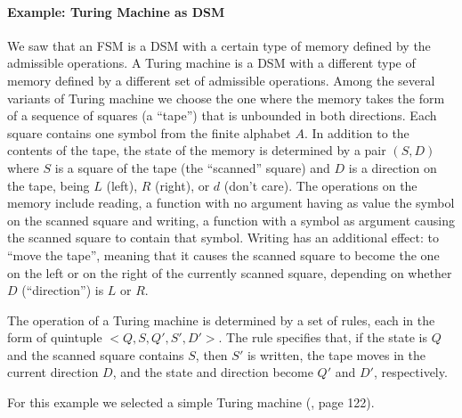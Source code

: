 \documentclass[preprint,11pt]{elsarticle}
\begin{document}
\paragraph{Example: Turing Machine as DSM}
We saw that an FSM is a DSM with a certain type of memory
defined by the admissible operations.
A Turing machine is a DSM with a different type of memory
defined by a different set of admissible operations.
Among the several variants of Turing machine
we choose the one where the memory takes the form of
a sequence of squares (a ``tape'') that is unbounded
in both directions.
Each square contains one symbol from the finite alphabet
$A$.
In addition to the contents of the tape,
the state of the memory is determined by a pair $(S,D)$
where $S$ is a square of the tape (the ``scanned'' square) and $D$
is a direction on the tape, being $L$ (left), $R$ (right),
or $d$ (don't care).
The operations on the memory include reading,
a function with no argument having as value
the symbol on the scanned square and writing,
a function with a symbol as argument
causing the scanned square to contain that symbol.
Writing has an additional effect:
to ``move the tape'',
meaning that it causes the scanned square to become
the one on the left or on the right of the currently scanned square,
depending on whether $D$ (``direction'') is $L$ or $R$.

The operation of a Turing machine is determined by a
set of rules, each in the form of quintuple $<Q,S,Q',S',D'>$.
The rule specifies that, if the state is $Q$
and the scanned square contains $S$,
then $S'$ is written, the tape moves in the current
direction $D$, and the state and direction become
$Q'$ and $D'$, respectively.

For this example we selected a simple Turing machine
(\cite{mnsk67}, page 122).
\end{document}
